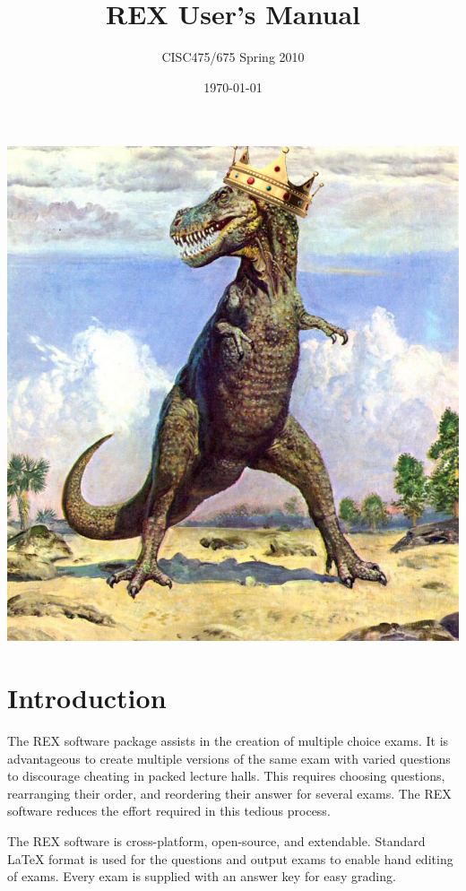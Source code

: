 \documentclass{article}
\author{CISC475/675 Spring 2010}
\title{REX User's Manual}
\date{\today}
\begin{document}
\maketitle
\begin{center}
\includegraphics{rex.png}
\end{center}

\newpage
\tableofcontents
\newpage

\section{Introduction}
The REX software package assists in the creation of multiple choice exams.
It is advantageous to create multiple versions of the same exam with varied
questions to discourage cheating in packed lecture halls. This requires choosing
questions, rearranging their order, and reordering their answer for several
exams. The REX software reduces the effort required in this tedious process.

The REX software is cross-platform, open-source, and extendable. Standard 
\LaTeX{} format is used for the questions and output exams to enable hand editing
of exams. Every exam is supplied with an answer key for easy grading.
\end{document}
